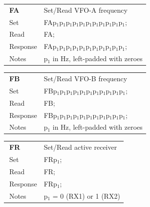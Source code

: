 \documentclass[12pt]{book}
\begin{document}
\begin{center}
\begin{tabular}{|p{2cm}|p{11cm}|}
\toprule
$\phantom{\Big|}$\textbf{\large FA} & Set/Read VFO-A frequency \\\cline{1-2}
$\phantom{\Big|}${\large Set} & {FAp$_1$p$_1$p$_1$p$_1$p$_1$p$_1$p$_1$p$_1$p$_1$p$_1$p$_1$;} \\\hline
$\phantom{\Big|}${\large Read} & {FA;} \\\hline
$\phantom{\Big|}${\large Response} & {FAp$_1$p$_1$p$_1$p$_1$p$_1$p$_1$p$_1$p$_1$p$_1$p$_1$p$_1$;} \\\hline
$\phantom{\Big|}${\large Notes} & \multicolumn{1}{|p{11cm}|}{p$_1$ in Hz, left-padded with zeroes} \\
\bottomrule
\end{tabular}
\end{center}

\begin{center}
\begin{tabular}{|p{2cm}|p{11cm}|}
\toprule
$\phantom{\Big|}$\textbf{\large FB} & Set/Read VFO-B frequency \\\cline{1-2}
$\phantom{\Big|}${\large Set} & {FBp$_1$p$_1$p$_1$p$_1$p$_1$p$_1$p$_1$p$_1$p$_1$p$_1$p$_1$;} \\\hline
$\phantom{\Big|}${\large Read} & {FB;} \\\hline
$\phantom{\Big|}${\large Response} & {FBp$_1$p$_1$p$_1$p$_1$p$_1$p$_1$p$_1$p$_1$p$_1$p$_1$p$_1$;} \\\hline
$\phantom{\Big|}${\large Notes} & \multicolumn{1}{|p{11cm}|}{p$_1$ in Hz, left-padded with zeroes} \\
\bottomrule
\end{tabular}
\end{center}

\begin{center}
\begin{tabular}{|p{2cm}|p{11cm}|}
\toprule
$\phantom{\Big|}$\textbf{\large FR} & Set/Read active receiver \\\cline{1-2}
$\phantom{\Big|}${\large Set} & {FRp$_1$;} \\\hline
$\phantom{\Big|}${\large Read} & {FR;} \\\hline
$\phantom{\Big|}${\large Response} & {FRp$_1$;} \\\hline
$\phantom{\Big|}${\large Notes} & \multicolumn{1}{|p{11cm}|}{p$_1$ = 0 (RX1) or 1 (RX2)} \\
\bottomrule
\end{tabular}
\end{center}
\end{document}
